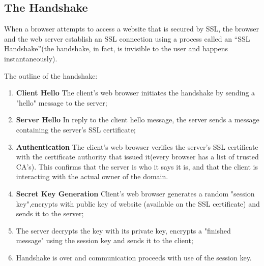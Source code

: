 \subsection{The Handshake} \cite{digicert} \cite{cloudflare_handshake}

When a browser attempts to access a website that is secured by SSL, the browser and the web server establish an SSL connection using a process called an “SSL Handshake”(the handshake, in fact, is invisible to the user and happens instantaneously).

The outline of the handshake:
\begin{enumerate}
\item \textbf{Client Hello} The client's web browser initiates the handshake by sending a "hello" message to the server;
\item \textbf{Server Hello} In reply to the client hello message, the server sends a message containing the server's SSL certificate;
\item \textbf{Authentication} The client's web browser verifies the server's SSL certificate with the certificate authority that issued it(every browser has a list of trusted CA's). This confirms that the server is who it says it is, and that the client is interacting with the actual owner of the domain.
\item \textbf{Secret Key Generation} Client's web browser generates a random "session key",encrypts with public key of website (available on the SSL certificate) and sends it to the server;
\item The server decrypts the key with its private key, encrypts a "finished message" using the session key and sends it to the client;
\item Handshake is over and communication proceeds with use of the session key.
\end{enumerate}

